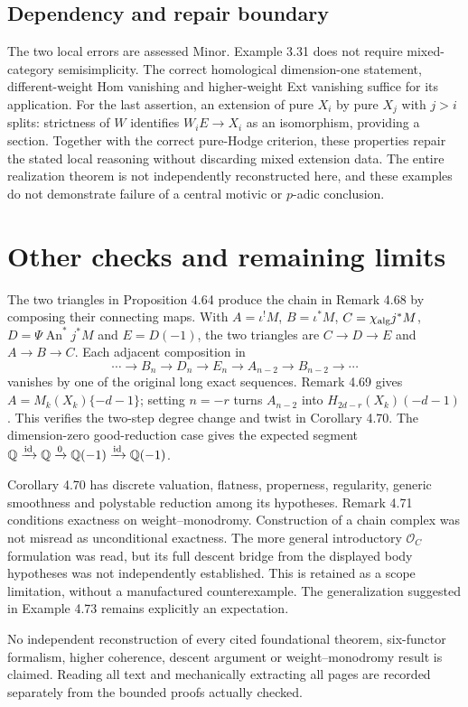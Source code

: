 \documentclass[10pt]{article}
\begin{document}
\subsection*{Dependency and repair boundary}
The two local errors are assessed Minor. Example 3.31 does not require mixed-category semisimplicity. The correct homological dimension-one statement, different-weight Hom vanishing and higher-weight Ext vanishing suffice for its application. For the last assertion, an extension of pure \(X_i\) by pure \(X_j\) with \(j>i\) splits: strictness of \(W\) identifies \(W_iE\to X_i\) as an isomorphism, providing a section. Together with the correct pure-Hodge criterion, these properties repair the stated local reasoning without discarding mixed extension data. The entire realization theorem is not independently reconstructed here, and these examples do not demonstrate failure of a central motivic or \(p\)-adic conclusion.\par
\section*{Other checks and remaining limits}
The two triangles in Proposition 4.64 produce the chain in Remark 4.68 by composing their connecting maps. With \(A=\iota^!M\), \(B=\iota^*M\), \(C=\chi_{\rm alg}j^*M\), \(D=\Psi\operatorname{An}^*j^*M\) and \(E=D(-1)\), the two triangles are \(C\to D\to E\) and \(A\to B\to C\). Each adjacent composition in \[\cdots\longrightarrow B_n\longrightarrow D_n\longrightarrow E_n
 \longrightarrow A_{n-2}\longrightarrow B_{n-2}\longrightarrow\cdots\] vanishes by one of the original long exact sequences. Remark 4.69 gives \(A=M_k(X_k)\{-d-1\}\); setting \(n=-r\) turns \(A_{n-2}\) into \(H_{2d-r}(X_k)(-d-1)\). This verifies the two-step degree change and twist in Corollary 4.70. The dimension-zero good-reduction case gives the expected segment \(\mathbb Q\xrightarrow{\rm id}\mathbb Q\xrightarrow0\mathbb Q(-1)
\xrightarrow{\rm id}\mathbb Q(-1)\).\par
Corollary 4.70 has discrete valuation, flatness, properness, regularity, generic smoothness and polystable reduction among its hypotheses. Remark 4.71 conditions exactness on weight–monodromy. Construction of a chain complex was not misread as unconditional exactness. The more general introductory \(\mathcal O_C\) formulation was read, but its full descent bridge from the displayed body hypotheses was not independently established. This is retained as a scope limitation, without a manufactured counterexample. The generalization suggested in Example 4.73 remains explicitly an expectation.\par
No independent reconstruction of every cited foundational theorem, six-functor formalism, higher coherence, descent argument or weight–monodromy result is claimed. Reading all text and mechanically extracting all pages are recorded separately from the bounded proofs actually checked.\par
\end{document}
